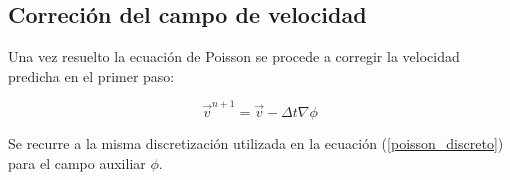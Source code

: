 \subsection{Correción del campo de velocidad}

Una vez resuelto la ecuación de Poisson se procede a corregir la velocidad predicha en el primer paso:

\begin{equation}
\vec{v}^{n+1} = \vec{v} - \Delta t \nabla \phi
\end{equation}

Se recurre a la misma discretización utilizada en la ecuación (\ref{poisson_discreto}) para el campo auxiliar $\phi$.
